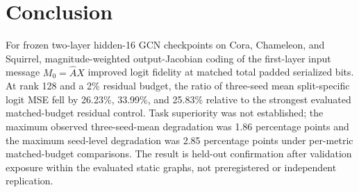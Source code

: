 \documentclass{article}
\begin{document}
\section{Conclusion}

\label{sec:conclusion}

For frozen two-layer hidden-16 GCN checkpoints on Cora, Chameleon, and Squirrel, magnitude-weighted output-Jacobian coding of the first-layer input message \(M_0=\hat{A}X\) improved logit fidelity at matched total padded serialized bits. At rank 128 and a 2\% residual budget, the ratio of three-seed mean split-specific logit MSE fell by 26.23\%, 33.99\%, and 25.83\% relative to the strongest evaluated matched-budget residual control. Task superiority was not established; the maximum observed three-seed-mean degradation was 1.86 percentage points and the maximum seed-level degradation was 2.85 percentage points under per-metric matched-budget comparisons. The result is held-out confirmation after validation exposure within the evaluated static graphs, not preregistered or independent replication.



\end{document}
